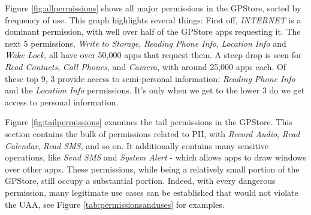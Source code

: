 Figure \ref{fig:allpermissions} shows all major permissions in the GPStore, sorted by frequency of use. This graph highlights several things: First off, \textit{INTERNET} is a dominant permission, with well over half of the GPStore apps requesting it. The next 5 permissions, \textit{Write to Storage}, \textit{Reading Phone Info}, \textit{Location Info} and \textit{Wake Lock}, all have over 50,000 apps that request them. A steep drop is seen for \textit{Read Contacts}, \textit{Call Phones}, and \textit{Camera}, with around 25,000 apps each. Of these top 9, 3 provide access to semi-personal information: \textit{Reading Phone Info} and the \textit{Location Info} permissions. It's only when we get to the lower 3 do we get access to personal information. 

Figure \ref{fig:tailpermissions} examines the tail permissions in the GPStore. This section contains the bulk of permissions related to PII, with \textit{Record Audio}, \textit{Read Calendar}, \textit{Read SMS}, and so on. It additionally contains many sensitive operations, like \textit{Send SMS} and \textit{System Alert} - which allows apps to draw windows over other apps. These permissions, while being a relatively small portion of the GPStore, still occupy a substantial portion. Indeed, with every dangerous permission, many legitimate use cases can be established that would not violate the UAA, see Figure \ref{tab:permissionsanduses} for examples.


